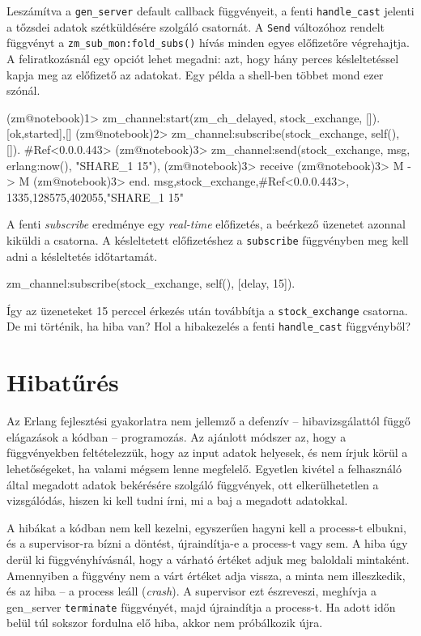 \documentclass[12pt, a4paper, oneside]{book}
\begin{document}
Leszámítva a \texttt{gen\_server} default callback függvényeit, a fenti
\texttt{handle\_cast} jelenti a tőzsdei adatok szétküldésére szolgáló
csatornát. A \texttt{Send} változóhoz rendelt függvényt a
\texttt{zm\_sub\_mon:fold\_subs()} hívás minden egyes előfizetőre végrehajtja. A
feliratkozásnál egy opciót lehet megadni: azt, hogy hány perces késleltetéssel
kapja meg az előfizető az adatokat. Egy példa a shell-ben többet mond ezer
szónál. 

\begin{code}{}{}
(zm@notebook)1> zm_channel:start(zm_ch_delayed, 
                                 stock_exchange, []).
{[{ok,started}],[]}
(zm@notebook)2> zm_channel:subscribe(stock_exchange, 
                                     self(), []).   
#Ref<0.0.0.443>
(zm@notebook)3> zm_channel:send(stock_exchange, 
                      {msg, {erlang:now(), "SHARE_1 15"}}),
(zm@notebook)3> receive
(zm@notebook)3> M -> M
(zm@notebook)3> end.
{msg,{stock_exchange,#Ref<0.0.0.443>},
     {{1335,128575,402055},"SHARE_1 15"}}
\end{code}

A fenti \emph{subscribe} eredménye egy \emph{real-time} előfizetés, a beérkező
üzenetet azonnal kiküldi a csatorna. A késleltetett előfizetéshez a
\texttt{subscribe} függvényben meg kell adni a késleltetés időtartamát.

\begin{code}{}{}
zm_channel:subscribe(stock_exchange, self(), [{delay, 15}]).
\end{code}

Így az üzeneteket 15 perccel érkezés után továbbítja a \texttt{stock\_exchange}
csatorna. De mi történik, ha hiba van? Hol a hibakezelés a fenti
\texttt{handle\_cast} függvényből?

\section{Hibatűrés}
Az Erlang fejlesztési gyakorlatra nem jellemző a defenzív -- hibavizsgálattól
függő elágazások a kódban -- programozás. Az ajánlott módszer az, hogy a
függvényekben feltételezzük, hogy az input adatok helyesek, és nem írjuk körül
a lehetőségeket, ha valami mégsem lenne megfelelő. Egyetlen kivétel a
felhasználó által megadott adatok bekérésére szolgáló függvények, ott
elkerülhetetlen a vizsgálódás, hiszen ki kell tudni írni, mi a baj a megadott
adatokkal.

A hibákat a kódban nem kell kezelni, egyszerűen hagyni kell a process-t
elbukni, és a supervisor-ra bízni a döntést, újraindítja-e a process-t vagy
sem. A hiba úgy derül ki függvényhívásnál, hogy a várható értéket adjuk meg
baloldali mintaként. Amennyiben a függvény nem a várt értéket adja vissza, a
minta nem illeszkedik, és az hiba -- a process leáll (\emph{crash}). A
supervisor ezt észreveszi, meghívja a gen\_server \texttt{terminate}
függvényét, majd újraindítja a process-t. Ha adott időn belül túl sokszor
fordulna elő hiba, akkor nem próbálkozik újra.
\end{document}
